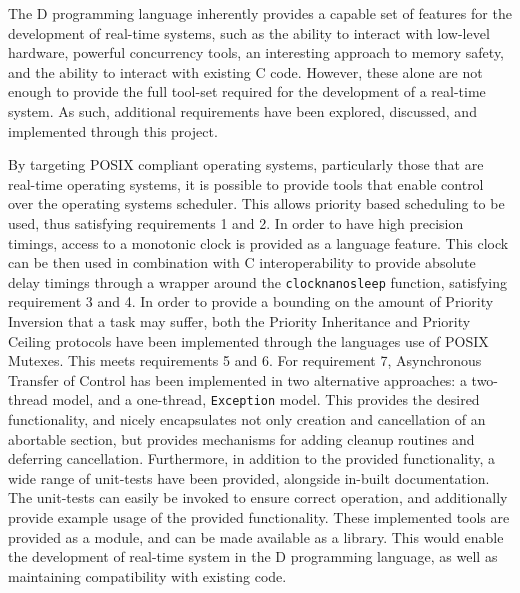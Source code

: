

The D programming language inherently provides a capable set of features for the 
development of real-time systems, such as the ability to interact with low-level 
hardware, powerful concurrency tools, an interesting approach to memory 
safety, and the ability to interact with existing C code. 
However, these alone are not enough to provide the full tool-set required for
the development of a real-time system. 
As such, additional requirements have been explored, discussed, and implemented 
through this project. 
\par\bigskip\noindent
By targeting POSIX compliant operating systems, particularly those that are
real-time operating systems, it is possible to provide tools that enable control 
over the operating systems scheduler. 
This allows priority based scheduling to be used, thus satisfying requirements
1 and 2.
In order to have high precision timings, access to a monotonic clock is provided 
as a language feature. 
This clock can be then used in combination with C
interoperability to provide absolute delay timings through a wrapper around the
\texttt{clock\textunderscore{}nanosleep} function, satisfying requirement 3 and
4. 
In order to provide a bounding on the amount of Priority Inversion that a task
may suffer, both the Priority Inheritance and Priority Ceiling protocols have
been implemented through the languages use of POSIX Mutexes. This meets
requirements 5 and 6. 
For requirement 7, Asynchronous Transfer of Control has been implemented in two 
alternative approaches: a two-thread model, and a one-thread, \texttt{Exception} model. 
This provides the desired functionality, and nicely encapsulates not only
creation and cancellation of an
abortable section, but provides mechanisms for adding cleanup routines and deferring 
cancellation. 
Furthermore, in addition to the provided functionality, a wide range of unit-tests 
have been provided, alongside in-built documentation. 
The unit-tests can easily be invoked to ensure correct operation, and
additionally provide example usage of the provided functionality. 
These implemented tools are provided as a module, and can be made available as 
a library. This would enable the development of real-time system in the D programming 
language, as well as maintaining compatibility with existing code. 
\par\bigskip\noindent
